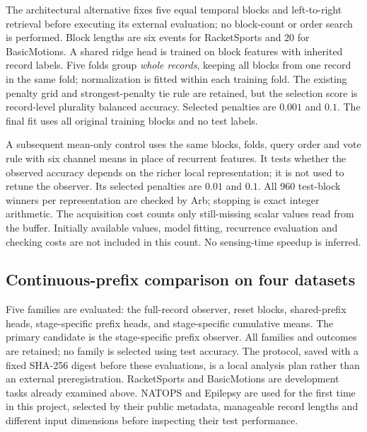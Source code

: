 \documentclass[11pt,a4paper]{article}
\theoremstyle{definition}\newtheorem{definition}[theorem]{Definition}
\begin{document}
The architectural alternative fixes five equal temporal blocks and left-to-right retrieval before executing its external evaluation; no block-count or order search is performed. Block lengths are six events for RacketSports and 20 for BasicMotions. A shared ridge head is trained on block features with inherited record labels. Five folds group \emph{whole records}, keeping all blocks from one record in the same fold; normalization is fitted within each training fold. The existing penalty grid and strongest-penalty tie rule are retained, but the selection score is record-level plurality balanced accuracy. Selected penalties are $0.001$ and $0.1$. The final fit uses all original training blocks and no test labels.

A subsequent mean-only control uses the same blocks, folds, query order and vote rule with six channel means in place of recurrent features. It tests whether the observed accuracy depends on the richer local representation; it is not used to retune the observer. Its selected penalties are $0.01$ and $0.1$. All 960 test-block winners per representation are checked by Arb; stopping is exact integer arithmetic. The acquisition cost counts only still-missing scalar values read from the buffer. Initially available values, model fitting, recurrence evaluation and checking costs are not included in this count. No sensing-time speedup is inferred.

\subsection{Continuous-prefix comparison on four datasets}\label{sec:prefixprotocol}
Five families are evaluated: the full-record observer, reset blocks, shared-prefix heads, stage-specific prefix heads, and stage-specific cumulative means. The primary candidate is the stage-specific prefix observer. All families and outcomes are retained; no family is selected using test accuracy. The protocol, saved with a fixed SHA-256 digest before these evaluations, is a local analysis plan rather than an external preregistration. RacketSports and BasicMotions are development tasks already examined above. NATOPS and Epilepsy are used for the first time in this project, selected by their public metadata, manageable record lengths and different input dimensions before inspecting their test performance.
\end{document}
